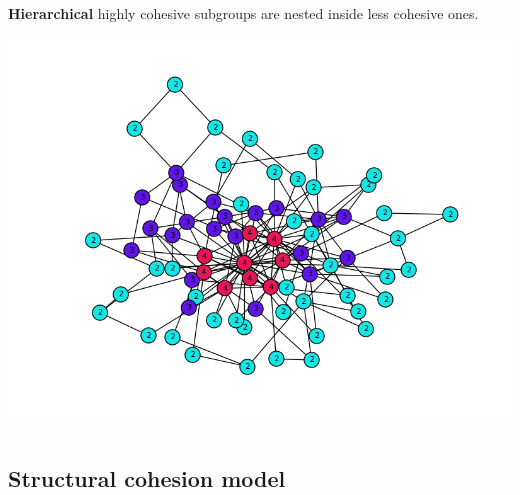 \documentclass[ignorenonframetext,red,8pt,notes=hide]{beamer}
\begin{document}
\begin{frame}[label=]
\begin{columns}[c]
\pause

\begin{column}{0.4\textwidth}
\textbf{Hierarchical} highly cohesive subgroups are nested inside less cohesive ones.

\begin{center}
\includegraphics[scale=0.25]{img/knum_colors}
\end{center}
\end{column}

\end{columns}

\end{frame}

\subsection{Structural cohesion model}
\end{document}
